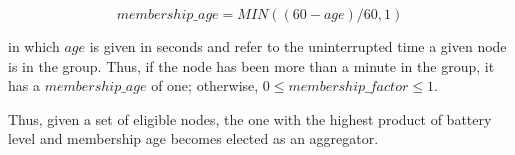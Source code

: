 $$
membership\_age = MIN((60 - age)/60, 1)
$$

\noindent
in which $age$ is given in seconds and refer to the uninterrupted time a given node is in the group. Thus, if the node has been more than a minute in the group, it has a $membership\_age$ of one; otherwise, $0 \le membership\_factor \le 1$.

Thus, given a set of eligible nodes, the one with the highest product of battery level and membership age becomes elected as an aggregator. 






%
%
%
%


